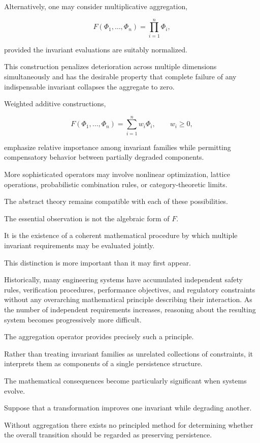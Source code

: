 \documentclass[11pt]{book}
\numberwithin{equation}{chapter}
\theoremstyle{definition}
\theoremstyle{plain}
\begin{document}
Alternatively, one may consider multiplicative aggregation,

\[
F(\Phi_1,\ldots,\Phi_n)
=
\prod_{i=1}^{n}\Phi_i,
\]

provided the invariant evaluations are suitably normalized.

This construction penalizes deterioration across multiple dimensions simultaneously and has the desirable property that complete failure of any indispensable invariant collapses the aggregate to zero.

Weighted additive constructions,

\[
F(\Phi_1,\ldots,\Phi_n)
=
\sum_{i=1}^{n}
w_i\Phi_i,
\qquad
w_i\ge0,
\]

emphasize relative importance among invariant families while permitting compensatory behavior between partially degraded components.

More sophisticated operators may involve nonlinear optimization, lattice operations, probabilistic combination rules, or category-theoretic limits.

The abstract theory remains compatible with each of these possibilities.

The essential observation is not the algebraic form of \(F\).

It is the existence of a coherent mathematical procedure by which multiple invariant requirements may be evaluated jointly.

This distinction is more important than it may first appear.

Historically, many engineering systems have accumulated independent safety rules, verification procedures, performance objectives, and regulatory constraints without any overarching mathematical principle describing their interaction. As the number of independent requirements increases, reasoning about the resulting system becomes progressively more difficult.

The aggregation operator provides precisely such a principle.

Rather than treating invariant families as unrelated collections of constraints, it interprets them as components of a single persistence structure.

The mathematical consequences become particularly significant when systems evolve.

Suppose that a transformation improves one invariant while degrading another.

Without aggregation there exists no principled method for determining whether the overall transition should be regarded as preserving persistence.
\end{document}
